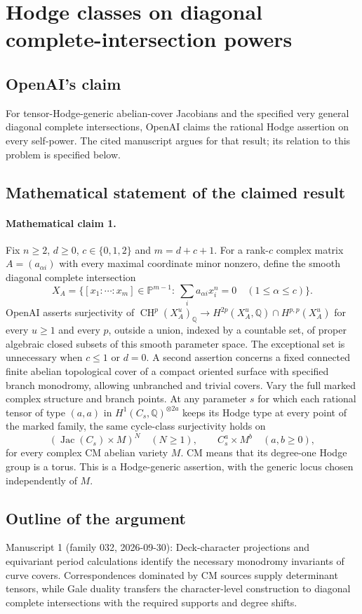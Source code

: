 \documentclass[11pt]{article}
\begin{document}
\section*{Hodge classes on diagonal complete-intersection powers}

\subsection{OpenAI's claim}
For tensor-Hodge-generic abelian-cover Jacobians and the specified very general diagonal complete intersections, OpenAI claims the rational Hodge assertion on every self-power. The cited manuscript argues for that result; its relation to this problem is specified below.

\subsection{Mathematical statement of the claimed result}
\paragraph{Mathematical claim 1.} Fix $n\ge2$, $d\ge0$, $c\in\{0,1,2\}$ and $m=d+c+1$. For a rank-$c$ complex matrix $A=(a_{\alpha i})$ with every maximal coordinate minor nonzero, define the smooth diagonal complete intersection
\[
X_A=\{[x_1:\cdots:x_m]\in\mathbb P^{m-1}:\ \sum_i a_{\alpha i}x_i^n=0\quad(1\le\alpha\le c)\}.
\]
OpenAI asserts surjectivity of $\operatorname{CH}^p(X_A^u)_{\mathbb Q}\to H^{2p}(X_A^u,\mathbb Q)\cap H^{p,p}(X_A^u)$ for every $u\ge1$ and every $p$, outside a union, indexed by a countable set, of proper algebraic closed subsets of this smooth parameter space. The exceptional set is unnecessary when $c\le1$ or $d=0$.
A second assertion concerns a fixed connected finite abelian topological cover of a compact oriented surface with specified branch monodromy, allowing unbranched and trivial covers. Vary the full marked complex structure and branch points. At any parameter $s$ for which each rational tensor of type $(a,a)$ in $H^1(C_s,\mathbb Q)^{\otimes 2a}$ keeps its Hodge type at every point of the marked family, the same cycle-class surjectivity holds on
\[
(\operatorname{Jac}(C_s)\times M)^N\quad(N\ge1),\qquad C_s^a\times M^b\quad(a,b\ge0),
\]
for every complex CM abelian variety $M$. CM means that its degree-one Hodge group is a torus. This is a Hodge-generic assertion, with the generic locus chosen independently of $M$.

\subsection{Outline of the argument}
Manuscript 1 (family 032, 2026-09-30): Deck-character projections and equivariant period calculations identify the necessary monodromy invariants of curve covers. Correspondences dominated by CM sources supply determinant tensors, while Gale duality transfers the character-level construction to diagonal complete intersections with the required supports and degree shifts.
\end{document}
